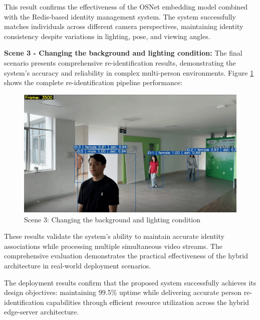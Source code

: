 This result confirms the effectiveness of the OSNet embedding model combined with the Redis-based identity management system. The system successfully matches individuals across different camera perspectives, maintaining identity consistency despite variations in lighting, pose, and viewing angles.

\textbf{Scene 3 - Changing the background and lighting condition:}
The final scenario presents comprehensive re-identification results, demonstrating the system's accuracy and reliability in complex multi-person environments. Figure \ref{fig:scene3_results} shows the complete re-identification pipeline performance:

\newpage

\begin{figure}[htbp]
    \centering
    \includegraphics[width=1\textwidth]{Figure/s3.png}
    \caption{Scene 3: Changing the background and lighting condition}
    \label{fig:scene3_results}
\end{figure}

These results validate the system's ability to maintain accurate identity associations while processing multiple simultaneous video streams. The comprehensive evaluation demonstrates the practical effectiveness of the hybrid architecture in real-world deployment scenarios.

The deployment results confirm that the proposed system successfully achieves its design objectives: maintaining 99.5\% uptime while delivering accurate person re-identification capabilities through efficient resource utilization across the hybrid edge-server architecture.



